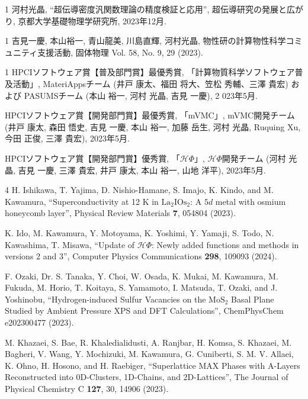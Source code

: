 \begin{招待講演}{1}
河村光晶,
``超伝導密度汎関数理論の精度検証と応用'',
超伝導研究の発展と広がり,
京都大学基礎物理学研究所,
2023年12月.
\end{招待講演}

\begin{招待論文}{1}
吉見一慶, 本山裕一, 青山龍美, 川島直輝, 河村光晶,
物性研の計算物性科学コミュニティ支援活動,
固体物理 Vol. 58, No. 9, 29 (2023).
\end{招待論文}

\begin{受賞}{1}
HPCIソフトウェア賞【普及部門賞】最優秀賞, 
「計算物質科学ソフトウェア普及活動」, 
MateriAppsチーム (井戸 康太、福田 将大、笠松 秀輔、三澤 貴宏) および PASUMSチーム (本山 裕一, 河村 光晶, 吉見 一慶), 2
023年5月.

HPCIソフトウェア賞【開発部門賞】最優秀賞,
「mVMC」, 
mVMC開発チーム (井戸 康太, 森田 悟史, 吉見 一慶, 本山 裕一, 加藤 岳生, 河村 光晶, Ruquing Xu, 今田 正俊, 三澤 貴宏), 
2023年5月.

HPCIソフトウェア賞【開発部門賞】優秀賞, 
「$\mathcal{H}\Phi$」, 
$\mathcal{H}\Phi$開発チーム (河村 光晶, 吉見 一慶, 三澤 貴宏, 井戸 康太, 本山 裕一, 山地 洋平), 
2023年5月.
\end{受賞}


\begin{雑誌論文}{4}
H. Ishikawa, T. Yajima, D. Nishio-Hamane, S. Imajo, K. Kindo, and M. Kawamura,
``Superconductivity at 12 K in ${\mathrm{La}}_{2}{\mathrm{IOs}}_{2}$: A $5d$ metal with osmium honeycomb layer'',
Physical Review Materials \textbf{7}, 054804 (2023).

K. Ido, M. Kawamura, Y. Motoyama, K. Yoshimi, Y. Yamaji, S. Todo, N. Kawashima, T. Misawa,
``Update of $\mathcal{H}\Phi$: Newly added functions and methods in versions 2 and 3'',
Computer Physics Communications \textbf{298}, 109093 (2024).

F. Ozaki, Dr. S. Tanaka, Y. Choi, W. Osada, K. Mukai, M. Kawamura, M. Fukuda, M. Horio, T. Koitaya, S. Yamamoto, I. Matsuda, T. Ozaki, and J. Yoshinobu,
``Hydrogen-induced Sulfur Vacancies on the $\mathrm{MoS}_2$ Basal Plane Studied by Ambient Pressure XPS and DFT Calculations'',
ChemPhysChem e202300477 (2023).

M. Khazaei, S. Bae, R. Khaledialidusti, A. Ranjbar, H. Komsa, S. Khazaei, M. Bagheri, V. Wang, Y. Mochizuki, M. Kawamura, G. Cuniberti, S. M. V. Allaei, K. Ohno, H. Hosono, and H. Raebiger, 
``Superlattice MAX Phases with A-Layers Reconstructed into 0D-Clusters, 1D-Chains, and 2D-Lattices'',
The Journal of Physical Chemistry C \textbf{127}, 30, 14906 (2023).

\end{雑誌論文}

